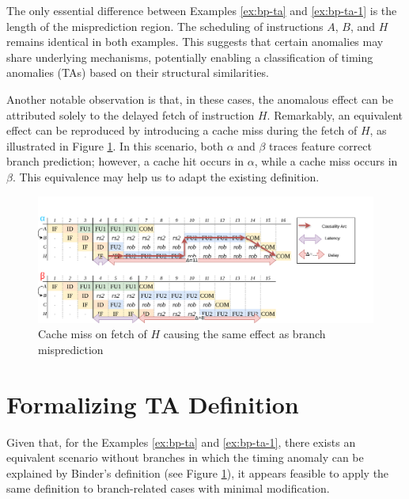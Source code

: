 The only essential difference between Examples \ref{ex:bp-ta} and \ref{ex:bp-ta-1} is the length of the misprediction region. The scheduling of instructions $A$, $B$, and $H$ remains identical in both examples. This suggests that certain anomalies may share underlying mechanisms, potentially enabling a classification of timing anomalies (TAs) based on their structural similarities.

Another notable observation is that, in these cases, the anomalous effect can be attributed solely to the delayed fetch of instruction $H$. Remarkably, an equivalent effect can be reproduced by introducing a cache miss during the fetch of $H$, as illustrated in Figure \ref{fig:equiv-to-bp-ta}. In this scenario, both $\alpha$ and $\beta$ traces feature correct branch prediction; however, a cache hit occurs in $\alpha$, while a cache miss occurs in $\beta$. This equivalence may help us to adapt the existing definition.


\begin{figure}[H]
    \centering
    \includegraphics[width=\textwidth]{figures/equiv-trace.png}
    \caption{Cache miss on fetch of $H$ causing the same effect as branch misprediction}
    \label{fig:equiv-to-bp-ta}
\end{figure}

\section{Formalizing TA Definition}

Given that, for the Examples \ref{ex:bp-ta} and \ref{ex:bp-ta-1}, there exists an equivalent scenario without branches in which the timing anomaly can be explained by Binder's definition (see Figure \ref{fig:equiv-to-bp-ta}), it appears feasible to apply the same definition to branch-related cases with minimal modification.


